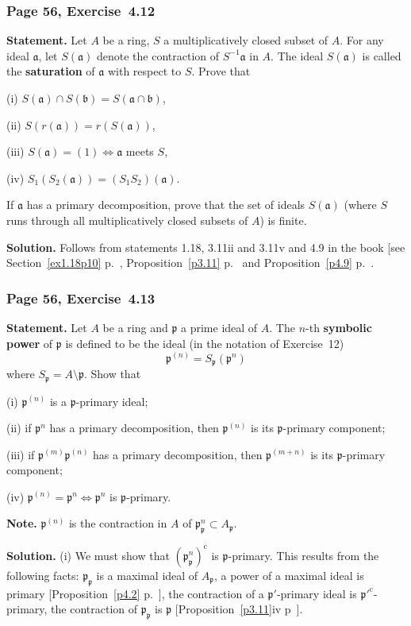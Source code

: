\documentclass[12pt,letterpaper]{article}%
\newcommand{\oo}{\operatorname}\newcommand{\ooo}{\operatorname*}
\newcommand{\mf}{\mathfrak}
\newcommand{\aaa}{\mf a}
\newcommand{\bbb}{\mf b}
\newcommand{\ppp}{\mf p}
\newcommand{\nn}{\noindent}
\begin{document}
\subsubsection{Page 56, Exercise~4.12}%

\textbf{Statement.} Let $A$ be a ring, $S$ a multiplicatively closed subset of $A$. For any ideal $\aaa$, let $S(\aaa)$ denote the contraction of $S^{-1}\aaa$ in $A$. The ideal $S(\aaa)$ is called the \textbf{saturation} of $\aaa$ with respect to $S$. Prove that

\nn(i) $S(\aaa)\cap S(\bbb)=S(\aaa\cap\bbb)$,

\nn(ii) $S(r(\aaa))=r(S(\aaa))$,

\nn(iii) $S(\aaa)=(1)\iff\aaa$ meets $S$,

\nn(iv) $S_1(S_2(\aaa))=(S_1S_2)(\aaa)$.

If $\aaa$ has a primary decomposition, prove that the set of ideals $S(\aaa)$ (where $S$ runs through all multiplicatively closed subsets of $A$) is finite.

\nn\textbf{Solution.} Follows from statements 1.18, 3.11ii and 3.11v and 4.9 in the book [see Section~\ref{ex1.18p10} p.~\pageref{ex1.18p10}, Proposition~\ref{p3.11} p.~\pageref{p3.11} and Proposition~\ref{p4.9} p.~\pageref{p4.9}.

\subsubsection{Page 56, Exercise~4.13}\label{ex4.13}%

\textbf{Statement.} Let $A$ be a ring and $\ppp$ a prime ideal of $A$. The $n$-th \textbf{symbolic power} of $\ppp$ is defined to be the ideal (in the notation of Exercise~12) 
$$
\ppp^{(n)}=S_\ppp(\ppp^n)
$$ 
where $S_\ppp=A\setminus\ppp$. Show that 

\nn(i) $\ppp^{(n)}$ is a $\ppp$-primary ideal;

\nn(ii) if $\ppp^n$ has a primary decomposition, then $\ppp^{(n)}$ is its $\ppp$-primary component;

\nn(iii) if $\ppp^{(m)}\ppp^{(n)}$ has a primary decomposition, then $\ppp^{(m+n)}$ is its $\ppp$-primary component;

\nn(iv) $\ppp^{(n)}=\ppp^n\iff\ppp^n$ is $\ppp$-primary.

\nn\textbf{Note.} $\ppp^{(n)}$ is the contraction in $A$ of $\ppp_\ppp^n\subset A_\ppp$.

\nn\textbf{Solution.} \nn(i) We must show that $(\ppp_\ppp^n)^{\oo c}$ is $\ppp$-primary. This results from the following facts: $\ppp_\ppp$ is a maximal ideal of $A_\ppp$, a power of a maximal ideal is primary [Proposition~\ref{p4.2} p.~\pageref{p4.2}], the contraction of a $\ppp'$-primary ideal is $\ppp'^{\oo c}$-primary, the contraction of $\ppp_\ppp$ is $\ppp$ [Proposition~\ref{p3.11}iv p~\pageref{p3.11}].
\end{document}
